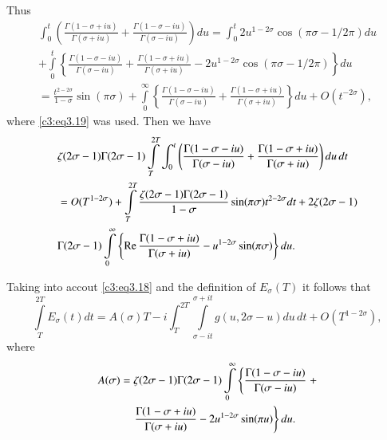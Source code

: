 Thus\pageoriginale
\begin{align*}
  \int_0^t \left(\frac{\Gamma (1- \sigma + iu)}{\Gamma (\sigma + iu)}
  + \frac{\Gamma (1- \sigma - iu)}{\Gamma (\sigma - iu)} \right)du = 
  \int_0^t 2 u^{1- 2\sigma} \cos (\pi \sigma - 1/2 \pi)du\\ 
  + \int\limits_0^t \left\{\frac{\Gamma (1- \sigma - iu)}{\Gamma (\sigma
    -iu)}+ \frac{\Gamma (1- \sigma + iu)}{\Gamma (\sigma + iu)} -
  2u^{1-2\sigma} \cos (\pi \sigma - 1/2 \pi)  \right\} du\\
  = \frac{t^{2-2\sigma}}{1- \sigma} \sin (\pi \sigma)+
    \int\limits_0^\infty  \left\{\frac{\Gamma (1- \sigma-iu)}{\Gamma
      (\sigma- iu)} + \frac{\Gamma (1- \sigma + iu)}{\Gamma (\sigma +
      iu)}  \right\} du + O(t^{- 2 \sigma}),
\end{align*}
where \eqref{c3:eq3.19} was used. Then we have
\begin{align*}
&  \zeta (2 \sigma -1) \Gamma (2 \sigma -1) \int\limits_T^{2T} \int_0^t
  \left(\frac{\Gamma (1- \sigma - iu)}{\Gamma (\sigma - iu)} + \frac{\Gamma
  (1- \sigma + iu)}{\Gamma (\sigma + iu)} \right) du\, dt\\ 
&  = O(T^{1-2\sigma}) + \int\limits_T^{2T} \frac{\zeta (2 \sigma
    -1)\Gamma (2 \sigma-1)}{1-\sigma} \sin (\pi \sigma) t^{2-2\sigma}
  dt + 2 \zeta (2\sigma -1)\\ 
&  \Gamma (2\sigma -1)
  \int\limits_0^\infty \left\{ \operatorname{Re} \frac{\Gamma (1- \sigma +
    iu)}{\Gamma (\sigma + iu)}- u^{1-2\sigma} \sin (\pi \sigma )
  \right\} du.
\end{align*}

Taking into accout \eqref{c3:eq3.18} and the definition of $E_\sigma
(T)$ it follows that 
\begin{equation}
  \int\limits_T^{2T} E_\sigma (t) dt = A (\sigma) T- i\int_T^{2T}
  \int\limits_{\sigma- it}^{\sigma + it} g(u, 2 \sigma - u) du \, dt +
  O(T^{1- 2 \sigma}),\label{c3:eq3.20}
\end{equation}
where 
\begin{align}
  A(\sigma) & = \zeta (2 \sigma -1) \Gamma (2 \sigma-1)
  \int\limits_0^\infty\notag 
  \left\{\frac{\Gamma (1-\sigma - iu)}{\Gamma (\sigma -iu)} \right. +\\
&\quad \left.  \frac{\Gamma (1- \sigma + iu)}{\Gamma (\sigma + iu)} - 2u^{1-2
    \sigma} \sin (\pi u) \right\} du.\label{c3:eq3.21}
\end{align}

